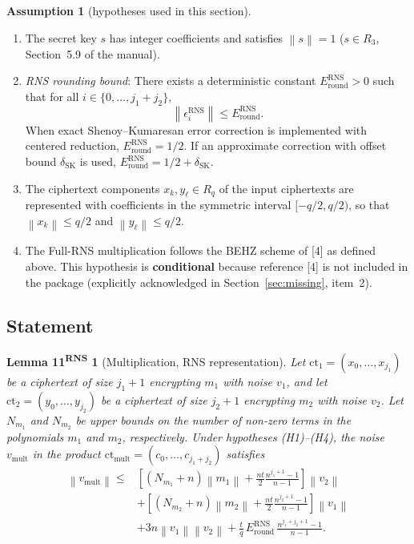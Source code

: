 \documentclass[11pt]{article}
\newcommand{\norm}[1]{\left\lVert #1\right\rVert}
\newcommand{\ct}{\mathrm{ct}}
\newcommand{\ctmult}{\mathrm{ct}_{\mathrm{mult}}}
\newcommand{\vmult}{v_{\mathrm{mult}}}
\newcommand{\Sgeo}[1]{\frac{n^{#1+1}-1}{n-1}}            %
\theoremstyle{plain}
\newtheorem*{lemmaRNSmult}{Lemma 11\textsuperscript{RNS}}
\theoremstyle{definition}
\newtheorem*{assumption*}{Assumption}
\theoremstyle{remark}
\begin{document}
\begin{assumption*}[hypotheses used in this section]
\begin{enumerate}[leftmargin=2em,label=(H\arabic*)]
\item The secret key $s$ has integer coefficients and satisfies $\norm{s}=1$ ($s\in R_3$, Section~5.9 of the manual).
\item \emph{RNS rounding bound}: There exists a deterministic constant $E_{\mathrm{round}}^{\mathrm{RNS}}>0$
      such that for all $i\in\{0,\dots,j_1+j_2\}$,
      \[
        \norm{\epsilon_i^{\mathrm{RNS}}} \leq E_{\mathrm{round}}^{\mathrm{RNS}}.
      \]
      When exact Shenoy--Kumaresan error correction is implemented with centered reduction,
      $E_{\mathrm{round}}^{\mathrm{RNS}} = 1/2$. If an approximate correction with offset bound $\delta_{\mathrm{SK}}$
      is used, $E_{\mathrm{round}}^{\mathrm{RNS}} = 1/2 + \delta_{\mathrm{SK}}$.
\item The ciphertext components $x_k, y_\ell\in R_q$ of the input ciphertexts are represented with
      coefficients in the symmetric interval $[-q/2, q/2)$, so that $\norm{x_k}\leq q/2$ and $\norm{y_\ell}\leq q/2$.
\item The Full-RNS multiplication follows the BEHZ scheme of [4] as defined above. This hypothesis is
      \textbf{conditional} because reference [4] is not included in the package (explicitly acknowledged
      in Section~\ref{sec:missing}, item~2).
\end{enumerate}
\end{assumption*}

\subsection{Statement}

\begin{lemmaRNSmult}[Multiplication, RNS representation]
Let $\ct_1=(x_0,\ldots,x_{j_1})$ be a ciphertext of size $j_1+1$ encrypting $m_1$ with noise $v_1$,
and let $\ct_2=(y_0,\ldots,y_{j_2})$ be a ciphertext of size $j_2+1$ encrypting $m_2$ with noise $v_2$.
Let $N_{m_1}$ and $N_{m_2}$ be upper bounds on the number of non-zero terms in the polynomials $m_1$
and $m_2$, respectively. Under hypotheses (H1)--(H4), the noise $\vmult$ in the product
$\ctmult=(c_0,\ldots,c_{j_1+j_2})$ satisfies
\begin{align*}
\norm{\vmult}\leq{}&
\left[
 (N_{m_1}+n)\norm{m_1}
 +\frac{nt}{2}\Sgeo{j_1}
\right]\norm{v_2}\\
&+\left[
 (N_{m_2}+n)\norm{m_2}
 +\frac{nt}{2}\Sgeo{j_2}
\right]\norm{v_1}\\
&+3n\norm{v_1}\norm{v_2}
 +\frac{t}{q}\,E_{\mathrm{round}}^{\mathrm{RNS}}\,\Sgeo{j_1+j_2}.
\end{align*}
\end{lemmaRNSmult}
\end{document}
